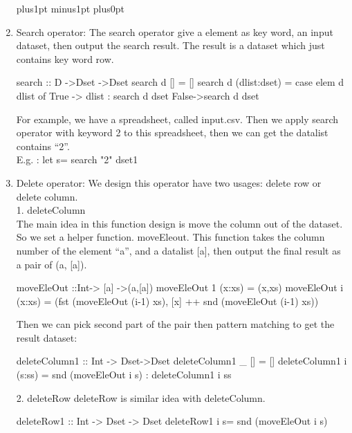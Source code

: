 \documentclass[11pt]{article}
\def\denseitems{
    \itemsep1pt plus1pt minus1pt
    \parsep0pt plus0pt
    \parskip0pt\topsep0pt}
\begin{document}
\begin{enumerate}[(1)]\denseitems
 \item  Search operator:
The search operator give a element as key word, an input dataset, then output the search result. The result is a dataset which just contains key word row. \\
\begin{program}
search ::  D ->Dset ->Dset 
search d [] = []
search d (dlist:dset) = case elem d dlist of
                          True -> dlist : search d dset
                          False->search d dset
\end{program}
For example, we have a spreadsheet, called input.csv. Then we apply search operator with keyword 2 to this spreadsheet, then we can get the datalist contains “2”. \\
E.g. : let s= search "2" dset1

\item Delete operator:
 We design this operator have two usages: delete row or delete column. \\
1. deleteColumn\\
The main idea in this function design is move the column out of the dataset. So we set a helper function. moveEleout. This function takes the column number of the element “a”, and a datalist [a], then output the final result as a pair of (a, [a]). 
\begin{program}
moveEleOut ::Int-> [a] ->(a,[a])
moveEleOut 1 (x:xs) = (x,xs)
moveEleOut i (x:xs) = (fst (moveEleOut (i-1) xs), [x] ++ snd (moveEleOut (i-1) xs))
\end{program}
Then we can pick second part of the pair then pattern matching to get the result dataset:
\\
\begin{program}
deleteColumn1 :: Int -> Dset->Dset 
deleteColumn1 _ []      = []
deleteColumn1 i (s:ss)  = snd (moveEleOut i s) : deleteColumn1 i ss
\end{program}
2. deleteRow
deleteRow is similar idea with deleteColumn. \\
\begin{program}
deleteRow1 :: Int ->  Dset -> Dset
deleteRow1 i s= snd (moveEleOut i s)
\end{program}


\end{enumerate}
\end{document}
